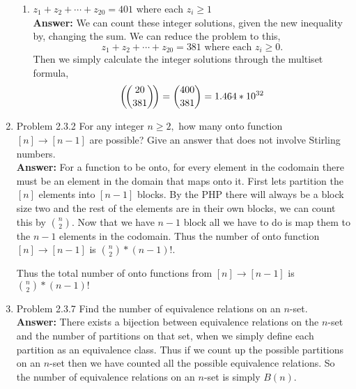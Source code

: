\documentclass{amsart}
\newcommand{\textmultiset}[2]{\bigl(\!{\binom{#1}{#2}}\!\bigr)}
\newcommand{\displaymultiset}[2]{\left(\!{\binom{#1}{#2}}\!\right)}
\newcommand\multiset[2]{\mathchoice{\displaymultiset{#1}{#2}}
                                {\textmultiset{#1}{#2}}
                                {\textmultiset{#1}{#2}}
                                {\textmultiset{#1}{#2}}}
\begin{document}
\begin{enumerate}
\begin{enumerate}
\item $z_1+z_2+\cdots +z_{20}=401$ where each $z_i \geq 1$\\
\textbf{Answer:} We can count these integer solutions, given the new inequality by, changing the sum. We can reduce the problem to this,
\begin{equation*}
z_1+z_2+\cdots +z_{20}=381 \text{ where each $z_i \geq 0$}.
\end{equation*}
Then we simply calculate the integer solutions through the multiset formula,
\begin{equation*}
\multiset{20}{381} = {{400}\choose{381}} = 1.464*10^{32}
\end{equation*}


\end{enumerate}
\vspace{1in}

\item Problem 2.3.2 For any integer $n \geq 2,$ how many onto function $[n] \to [n-1]$ are possible? Give an answer that does not involve Stirling numbers.\\
\textbf{Answer:} For a function to be onto, for every element in the codomain there must be an element in the domain that maps onto it. First lets partition the $[n]$ elements into $[n-1]$ blocks. By the PHP there will always be a block size two and the rest of the elements are in their own blocks, we can count this by ${{n}\choose{2}}$. Now that we have $n-1$ block all we have to do is map them to the $n-1$ elements in the codomain. Thus the number of onto function $[n] \to [n-1]$ is ${{n}\choose{2}}*(n-1)!$.




Thus the total number of onto functions from $[n] \to [n-1]$ is ${{n}\choose {2}}*(n-1)!$\\

\item Problem 2.3.7 Find the number of equivalence relations on an $n$-set.\\
\textbf{Answer:} There exists a bijection between equivalence relations on the $n$-set and the number of partitions on that set, when we simply define each partition as an equivalence class. Thus if we count up the possible partitions on an $n$-set then we have counted all the possible equivalence relations. So the number of equivalence relations on an $n$-set is simply $B(n)$.

\end{enumerate}
\end{document}
